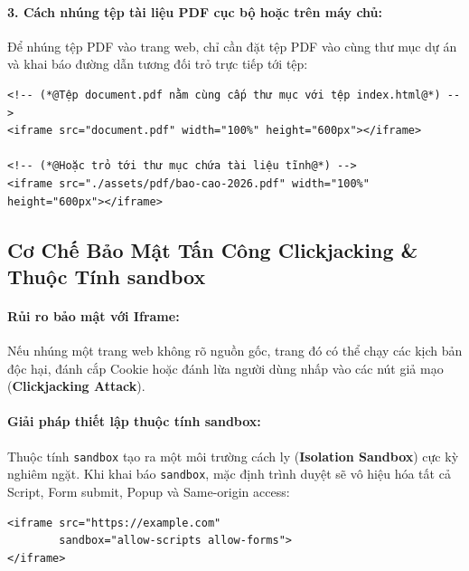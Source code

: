 \documentclass[11pt,oneside]{book}
\newcommand{\codeinline}[1]{\textcolor{accentOrange}{\texttt{#1}}}
\newcommand{\term}[1]{\textbf{\textcolor{primaryBlue}{#1}}}
\begin{document}
\paragraph{3. Cách nhúng tệp tài liệu PDF cục bộ hoặc trên máy chủ:}
Để nhúng tệp PDF vào trang web, chỉ cần đặt tệp PDF vào cùng thư mục dự án và khai báo đường dẫn tương đối trỏ trực tiếp tới tệp:
\begin{codeWindow}
\begin{lstlisting}[language=HTML5]
<!-- (*@Tệp document.pdf nằm cùng cấp thư mục với tệp index.html@*) -->
<iframe src="document.pdf" width="100%" height="600px"></iframe>

<!-- (*@Hoặc trỏ tới thư mục chứa tài liệu tĩnh@*) -->
<iframe src="./assets/pdf/bao-cao-2026.pdf" width="100%" height="600px"></iframe>
\end{lstlisting}
\end{codeWindow}


\subsection{Cơ Chế Bảo Mật Tấn Công Clickjacking \& Thuộc Tính sandbox}

\paragraph{Rủi ro bảo mật với Iframe:}
Nếu nhúng một trang web không rõ nguồn gốc, trang đó có thể chạy các kịch bản độc hại, đánh cắp Cookie hoặc đánh lừa người dùng nhấp vào các nút giả mạo (\term{Clickjacking Attack}).

\paragraph{Giải pháp thiết lập thuộc tính sandbox:}
Thuộc tính \codeinline{sandbox} tạo ra một môi trường cách ly (\term{Isolation Sandbox}) cực kỳ nghiêm ngặt. Khi khai báo \codeinline{sandbox}, mặc định trình duyệt sẽ vô hiệu hóa tất cả Script, Form submit, Popup và Same-origin access:
\begin{codeWindow}
\begin{lstlisting}[language=HTML5]
<iframe src="https://example.com" 
        sandbox="allow-scripts allow-forms">
</iframe>
\end{lstlisting}
\end{codeWindow}
\end{document}
